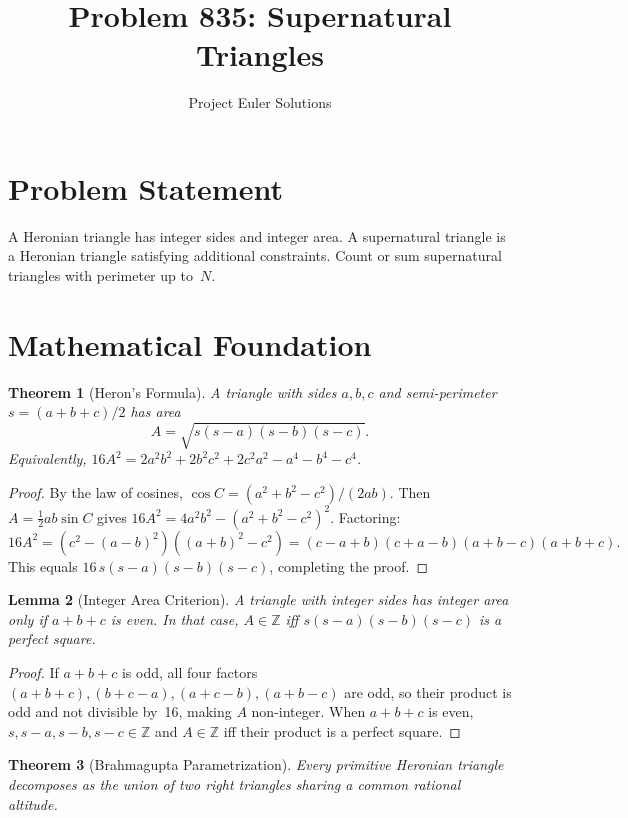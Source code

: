 \documentclass[11pt]{article}
\title{Problem 835: Supernatural Triangles}
\author{Project Euler Solutions}
\date{}
\newtheorem{theorem}{Theorem}
\newtheorem{lemma}[theorem]{Lemma}
\begin{document}
\maketitle

\section{Problem Statement}

A Heronian triangle has integer sides and integer area. A supernatural triangle is a Heronian triangle satisfying additional constraints. Count or sum supernatural triangles with perimeter up to~$N$.

\section{Mathematical Foundation}

\begin{theorem}[Heron's Formula]
A triangle with sides $a,b,c$ and semi-perimeter $s=(a+b+c)/2$ has area
\[
A = \sqrt{s(s-a)(s-b)(s-c)}.
\]
Equivalently, $16A^2 = 2a^2b^2+2b^2c^2+2c^2a^2-a^4-b^4-c^4$.
\end{theorem}

\begin{proof}
By the law of cosines, $\cos C=(a^2+b^2-c^2)/(2ab)$. Then $A=\tfrac{1}{2}ab\sin C$ gives $16A^2=4a^2b^2-(a^2+b^2-c^2)^2$. Factoring:
\[
16A^2 = (c^2-(a-b)^2)((a+b)^2-c^2) = (c-a+b)(c+a-b)(a+b-c)(a+b+c).
\]
This equals $16\,s(s-a)(s-b)(s-c)$, completing the proof.
\end{proof}

\begin{lemma}[Integer Area Criterion]
A triangle with integer sides has integer area only if $a+b+c$ is even. In that case, $A\in\mathbb{Z}$ iff $s(s-a)(s-b)(s-c)$ is a perfect square.
\end{lemma}

\begin{proof}
If $a+b+c$ is odd, all four factors $(a+b+c),(b+c-a),(a+c-b),(a+b-c)$ are odd, so their product is odd and not divisible by~16, making $A$ non-integer. When $a+b+c$ is even, $s,s-a,s-b,s-c\in\mathbb{Z}$ and $A\in\mathbb{Z}$ iff their product is a perfect square.
\end{proof}

\begin{theorem}[Brahmagupta Parametrization]
Every primitive Heronian triangle decomposes as the union of two right triangles sharing a common rational altitude.
\end{theorem}
\end{document}
